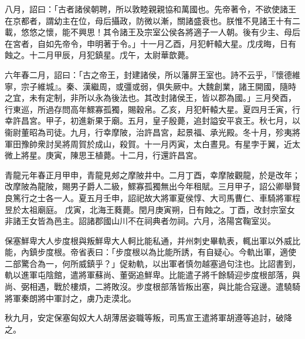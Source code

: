 \begin{pinyinscope}
 
 
 
 八月，詔曰：「古者諸侯朝聘，所以敦睦親親協和萬國也。先帝著令，不欲使諸王在京都者，謂幼主在位，母后攝政，防微以漸，關諸盛衰也。朕惟不見諸王十有二載，悠悠之懷，能不興思！其令諸王及宗室公侯各將適子一人朝。後有少主、母后在宮者，自如先帝令，申明著于令。」十一月乙酉，月犯軒轅大星。戊戌晦，日有蝕之。十二月甲辰，月犯鎮星。戊午，太尉華歆薨。
 
 
 
 
 六年春二月，詔曰：「古之帝王，封建諸侯，所以藩屏王室也。詩不云乎，『懷德維寧，宗子維城』。秦、漢繼周，或彊或弱，俱失厥中。大魏創業，諸王開國，隨時之宜，未有定制，非所以永為後法也。其改封諸侯王，皆以郡為國。」三月癸酉，行東巡，所過存問高年鰥寡孤獨，賜穀帛。乙亥，月犯軒轅大星。夏四月壬寅，行幸許昌宮。甲子，初進新果于廟。五月，皇子殷薨，追封謚安平哀王。秋七月，以衞尉董昭為司徒。九月，行幸摩陂，治許昌宮，起景福、承光殿。冬十月，殄夷將軍田豫帥衆討吴將周賀於成山，殺賀。十一月丙寅，太白晝見。有星孛于翼，近太微上將星。庚寅，陳思王植薨。十二月，行還許昌宮。
 
 
青龍元年春正月甲申，青龍見郟之摩陂井中。二月丁酉，幸摩陂觀龍，於是改年；改摩陂為龍陂，賜男子爵人二級，鰥寡孤獨無出今年租賦。三月甲子，詔公卿舉賢良篤行之士各一人。夏五月壬申，詔祀故大將軍夏侯惇、大司馬曹仁、車騎將軍程昱於太祖廟庭。
 戊寅，北海王蕤薨。閏月庚寅朔，日有蝕之。丁酉，改封宗室女非諸王女皆為邑主。詔諸郡國山川不在祠典者勿祠。六月，洛陽宮鞠室災。
 
 
 
 
 保塞鮮卑大人步度根與叛鮮卑大人軻比能私通，并州刺史畢軌表，輒出軍以外威比能，內鎮步度根。帝省表曰：「步度根以為比能所誘，有自疑心。今軌出軍，適使二部驚合為一，何所威鎮乎？」促勑軌，以出軍者慎勿越塞過句注也。比詔書到，軌以進軍屯陰館，遣將軍蘇尚、董弼追鮮卑。比能遣子將千餘騎迎步度根部落，與尚、弼相遇，戰於樓煩，二將敗沒。步度根部落皆叛出塞，與比能合寇邊。遣驍騎將軍秦朗將中軍討之，虜乃走漠北。
 
 
 
 
 秋九月，安定保塞匈奴大人胡薄居姿職等叛，司馬宣王遣將軍胡遵等追討，破降之。
 

\end{pinyinscope}
